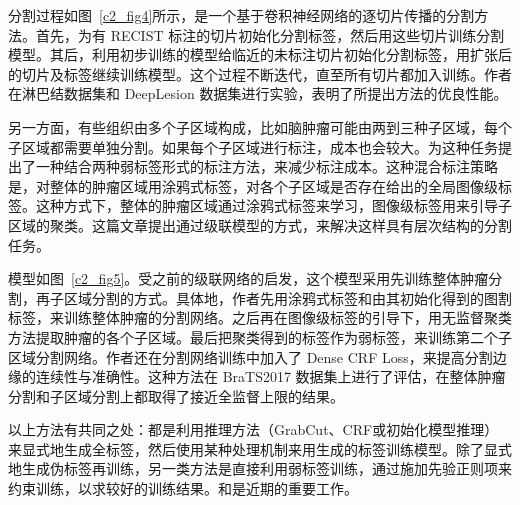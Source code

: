 分割过程如图~\ref{c2_fig4}所示，是一个基于卷积神经网络的逐切片传播的分割方法。首先，为有 RECIST 标注的切片初始化分割标签，然后用这些切片训练分割模型。其后，利用初步训练的模型给临近的未标注切片初始化分割标签，用扩张后的切片及标签继续训练模型。这个过程不断迭代，直至所有切片都加入训练。作者在淋巴结数据集和\citep{roth2014new} DeepLesion 数据集\citep{yan2018deep}进行实验，表明了所提出方法的优良性能。

另一方面，有些组织由多个子区域构成，比如脑肿瘤可能由两到三种子区域，每个子区域都需要单独分割。如果每个子区域进行标注，成本也会较大。\citet{ji2019scribble}为这种任务提出了一种结合两种弱标签形式的标注方法，来减少标注成本。这种混合标注策略是，对整体的肿瘤区域用涂鸦式标签，对各个子区域是否存在给出的全局图像级标签。这种方式下，整体的肿瘤区域通过涂鸦式标签来学习，图像级标签用来引导子区域的聚类。这篇文章提出通过级联模型的方式，来解决这样具有层次结构的分割任务。

模型如图~\ref{c2_fig5}。受之前的级联网络的启发，这个模型采用先训练整体肿瘤分割，再子区域分割的方式。具体地，作者先用涂鸦式标签和由其初始化得到的图割标签，来训练整体肿瘤的分割网络。之后再在图像级标签的引导下，用无监督聚类方法提取肿瘤的各个子区域。最后把聚类得到的标签作为弱标签，来训练第二个子区域分割网络。作者还在分割网络训练中加入了 Dense CRF Loss，来提高分割边缘的连续性与准确性。这种方法在 BraTS2017 数据集上进行了评估，在整体肿瘤分割和子区域分割上都取得了接近全监督上限的结果。

以上方法有共同之处：都是利用推理方法（GrabCut、CRF或初始化模型推理）来显式地生成全标签，然后使用某种处理机制来用生成的标签训练模型。除了显式地生成伪标签再训练，另一类方法是直接利用弱标签训练，通过施加先验正则项来约束训练，以求较好的训练结果。\citet{kervadec2020bounding}和\citet{tang2018regularized}是近期的重要工作。

